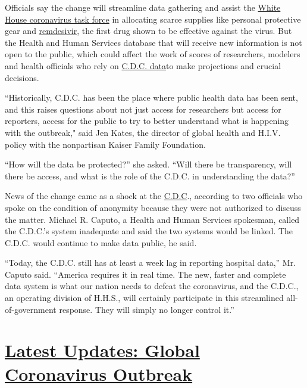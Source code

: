 Officials say the change will streamline data gathering and assist the
\href{https://www.nytimes.com/2020/07/18/us/politics/trump-coronavirus-response-failure-leadership.html}{White
House coronavirus task force} in allocating scarce supplies like
personal protective gear and
\href{https://www.nytimes.com/2020/06/29/health/coronavirus-remdesivir-gilead.html}{remdesivir},
the first drug shown to be effective against the virus. But the Health
and Human Services database that will receive new information is not
open to the public, which could affect the work of scores of
researchers, modelers and health officials who rely on
\href{https://www.cdc.gov/nhsn/covid19/report-patient-impact.html}{C.D.C.
data}to make projections and crucial decisions.

``Historically, C.D.C. has been the place where public health data has
been sent, and this raises questions about not just access for
researchers but access for reporters, access for the public to try to
better understand what is happening with the outbreak," said Jen Kates,
the director of global health and H.I.V. policy with the nonpartisan
Kaiser Family Foundation.

``How will the data be protected?'' she asked. ``Will there be
transparency, will there be access, and what is the role of the C.D.C.
in understanding the data?''

News of the change came as a shock at the
\href{https://www.nytimes.com/2020/07/24/health/cdc-schools-coronavirus.html}{C.D.C}.,
according to two officials who spoke on the condition of anonymity
because they were not authorized to discuss the matter. Michael R.
Caputo, a Health and Human Services spokesman, called the C.D.C.'s
system inadequate and said the two systems would be linked. The C.D.C.
would continue to make data public, he said.

``Today, the C.D.C. still has at least a week lag in reporting hospital
data,'' Mr. Caputo said. ``America requires it in real time. The new,
faster and complete data system is what our nation needs to defeat the
coronavirus, and the C.D.C., an operating division of H.H.S., will
certainly participate in this streamlined all-of-government response.
They will simply no longer control it.''

\hypertarget{latest-updates-global-coronavirus-outbreak}{%
\section{\texorpdfstring{\href{https://www.nytimes.com/2020/08/01/world/coronavirus-covid-19.html?action=click\&pgtype=Article\&state=default\&region=MAIN_CONTENT_1\&context=storylines_live_updates}{Latest
Updates: Global Coronavirus
Outbreak}}{Latest Updates: Global Coronavirus Outbreak}}\label{latest-updates-global-coronavirus-outbreak}}

